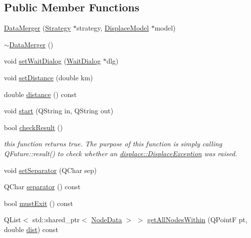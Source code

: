 \subsection*{Public Member Functions}
\begin{DoxyCompactItemize}
\item 
\mbox{\hyperlink{classdisplace_1_1workers_1_1_data_merger_a7fba60bcda4bf09e0abed25bd541a828}{Data\+Merger}} (\mbox{\hyperlink{classdisplace_1_1workers_1_1_data_merger_1_1_strategy}{Strategy}} $\ast$strategy, \mbox{\hyperlink{class_displace_model}{Displace\+Model}} $\ast$model)
\item 
\mbox{\hyperlink{classdisplace_1_1workers_1_1_data_merger_aaf089ecdf095a33d201f29afc08f9aee}{$\sim$\+Data\+Merger}} ()
\item 
void \mbox{\hyperlink{classdisplace_1_1workers_1_1_data_merger_a65d073255b885c3a9e310be667f9b5e5}{set\+Wait\+Dialog}} (\mbox{\hyperlink{class_wait_dialog}{Wait\+Dialog}} $\ast$dlg)
\item 
void \mbox{\hyperlink{classdisplace_1_1workers_1_1_data_merger_ade4192def5a204bbe4430b0363271286}{set\+Distance}} (double km)
\item 
double \mbox{\hyperlink{classdisplace_1_1workers_1_1_data_merger_a36e7e47d2a982fb27f62062b6f87e200}{distance}} () const
\item 
void \mbox{\hyperlink{classdisplace_1_1workers_1_1_data_merger_a5068538e1910ff25af664f2688ba0ff5}{start}} (Q\+String in, Q\+String out)
\item 
bool \mbox{\hyperlink{classdisplace_1_1workers_1_1_data_merger_a54a48f439d76ecc9ebf6cfd55facee69}{check\+Result}} ()
\begin{DoxyCompactList}\small\item\em this function returns true. The purpose of this function is simply calling Q\+Future\+::result() to check whether an \mbox{\hyperlink{classdisplace_1_1_displace_exception}{displace\+::\+Displace\+Exception}} was raised. \end{DoxyCompactList}\item 
void \mbox{\hyperlink{classdisplace_1_1workers_1_1_data_merger_aeebbad040f2c93ca6c7df74e11774d38}{set\+Separator}} (Q\+Char sep)
\item 
Q\+Char \mbox{\hyperlink{classdisplace_1_1workers_1_1_data_merger_a4d0e7798450a8fa822600c4a9afe05f7}{separator}} () const
\item 
bool \mbox{\hyperlink{classdisplace_1_1workers_1_1_data_merger_a62c381a858158b73c29eb241ce9e3967}{must\+Exit}} () const
\item 
Q\+List$<$ std\+::shared\+\_\+ptr$<$ \mbox{\hyperlink{class_node_data}{Node\+Data}} $>$ $>$ \mbox{\hyperlink{classdisplace_1_1workers_1_1_data_merger_a951c8ad8be5d8a352a7896d6f27b5abf}{get\+All\+Nodes\+Within}} (Q\+PointF pt, double \mbox{\hyperlink{my_rutils_8h_adce57df8ac5e5faa57d86a66535fdd92}{dist}}) const
\end{DoxyCompactItemize}
